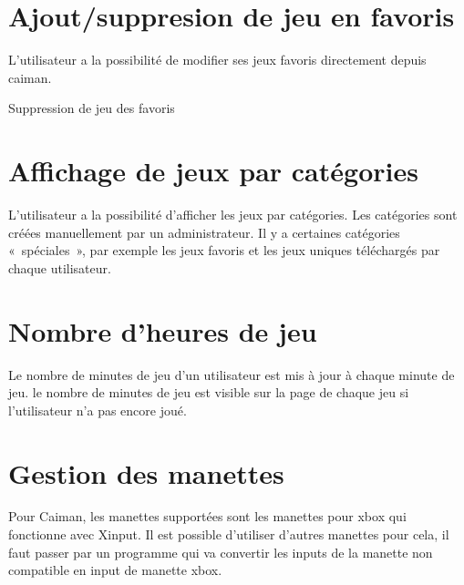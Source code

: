 \documentclass[a4paper,12pt,french]{sphinxmanual}
\begin{document}
\section{Ajout/suppresion de jeu en favoris}
\label{\detokenize{fonctionnelleC_:ajout-suppresion-de-jeu-en-favoris}}
\sphinxAtStartPar
L’utilisateur a la possibilité de modifier ses jeux favoris directement depuis caiman.

\sphinxAtStartPar
{}

\sphinxAtStartPar
Suppression de jeu des favoris

\sphinxAtStartPar
{}


\section{Affichage de jeux par catégories}
\label{\detokenize{fonctionnelleC_:affichage-de-jeux-par-categories}}
\sphinxAtStartPar
L’utilisateur a la possibilité d’afficher les jeux par catégories. Les catégories sont créées manuellement par un administrateur. Il y a certaines catégories « spéciales », par exemple les jeux favoris et les jeux uniques téléchargés par chaque utilisateur.

\sphinxAtStartPar
{}


\section{Nombre d’heures de jeu}
\label{\detokenize{fonctionnelleC_:nombre-dheures-de-jeu}}
\sphinxAtStartPar
Le nombre de minutes de jeu d’un utilisateur est mis à jour à chaque minute de jeu. le nombre de minutes de jeu est visible sur la page de chaque jeu si l’utilisateur n’a pas encore joué.

\sphinxAtStartPar
{}


\section{Gestion des manettes}
\label{\detokenize{fonctionnelleC_:gestion-des-manettes}}
\sphinxAtStartPar
Pour Caiman, les manettes supportées sont les manettes pour xbox qui fonctionne avec Xinput. Il est possible d’utiliser d’autres manettes pour cela, il faut passer par un programme qui va convertir les inputs de la manette non compatible en input de manette xbox.
\end{document}
